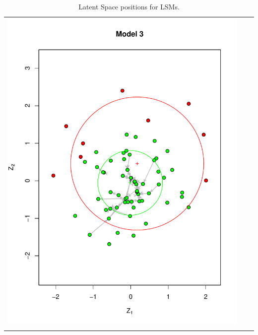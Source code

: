 \documentclass[fleqn,12pt]{wlscirep}
\begin{document}
\begin{longtable}[!h]{ccc}
\includegraphics[height=.3\textheight, clip=true, trim=2.05cm 2.55cm 1cm 2cm]{figures/LSM_m3.pdf} \\
\caption{\label{fig:LSM_plot_1} Latent Space positions for LSMs.}
\end{longtable}
\end{document}
